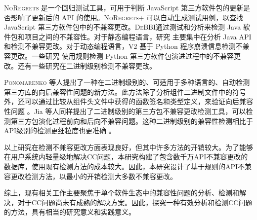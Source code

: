 \textsc{NoRegrets} 是一个回归测试工具，可用于判断 JavaScript 第三方软件包的更新是否影响了更新后的 API 的使用。\textsc{NoRegrets+} 可以自动生成测试用例，以查找 JavaScript 第三方软件包中的不兼容更改。\textsc{DeBBI}通过测试和分析来检测 Java 软件包和项目之间的不兼容性。对于静态编程语言，研究 主要集中在分析 Java API 和检测不兼容更改。对于动态编程语言，\textsc{V2}  基于 Python 程序崩溃信息检测不兼容更改。一些研究 使用规则检测 Python 第三方软件包演进过程中的不兼容更改。还有一些研究在二进制级别检测不兼容更改。

\textsc{Ponomarenko} 等人提出了一种在二进制级别的、可适用于多种语言的、自动检测第三方库的向后兼容性问题的新方法。此方法除了分析组件二进制文件中的符号外，还可以通过比较从组件头文件中获得的函数签名和类型定义，来验证向后兼容性问题 。Jia 等人同样提出了二进制级别的第三方包不兼容更改检测工具，可以检测第三方包演化过程前向和后向不兼容问题。这种二进制级别的兼容性检测相比于API级别的检测更细粒度也更准确 。

以上研究在检测不兼容更改方面表现良好，但其中许多方法的开销较大。为了能够在用户系统内轻量级地解决CC问题，本研究构建了包含数千万API不兼容更改的数据库，使用现有检测方法的成本较大。因此，本研究设计了基于规则的API不兼容更改检测方法，以最小的开销检测大多数不兼容更改。

综上，现有相关工作主要聚焦于单个软件生态中的兼容性问题的分析、检测和解决，对于CC问题尚未有成熟的解决方案。因此，探究一种有效分析和检测CC问题的方法，具有相当的研究意义和实践意义。



